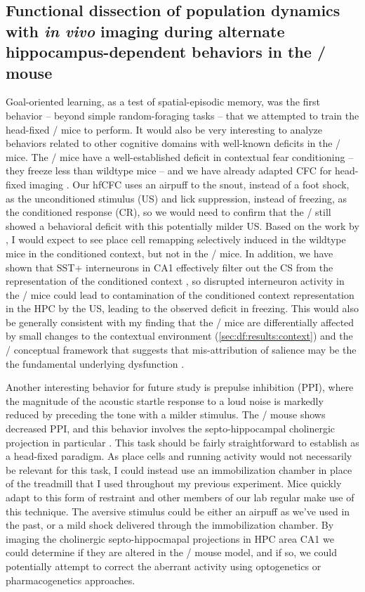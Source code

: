 \subsection{Functional dissection of population dynamics with \emph{in vivo} imaging during alternate hippocampus-dependent behaviors in the \df/ mouse}
Goal-oriented learning, as a test of spatial-episodic memory, was the first behavior -- beyond simple random-foraging tasks -- that we attempted to train the head-fixed \df/ mice to perform.
It would also be very interesting to analyze behaviors related to other cognitive domains with well-known deficits in the \df/ mice.
The \df/ mice have a well-established deficit in contextual fear conditioning \citep[CFC,][]{Stark2008} -- they freeze less than wildtype mice -- and we have already adapted CFC for head-fixed imaging \citep[hfCFC,][]{Lovett-Barron2014}.
Our hfCFC uses an airpuff to the snout, instead of a foot shock, as the unconditioned stimulus (US) and lick suppression, instead of freezing, as the conditioned response (CR), so we would need to confirm that the \df/ still showed a behavioral deficit with this potentially milder US.
Based on the work by \citeauthor{Moita2004}, I would expect to see place cell remapping selectively induced in the wildtype mice in the conditioned context, but not in the \df/ mice.
In addition, we have shown that SST+ interneurons in CA1 effectively filter out the CS from the representation of the conditioned context \citep{Lovett-Barron2014}, so disrupted interneuron activity in the \df/ mice could lead to contamination of the conditioned context representation in the \ac{HPC} by the US, leading to the observed deficit in freezing.
This would also be generally consistent with my finding that the \df/ mice are differentially affected by small changes to the contextual environment (\autoref{sec:df:results:context}) and the \scz/ conceptual framework that suggests that mis-attribution of salience may be the the fundamental underlying dysfunction \citep{Kapur2003a, VanOs2009}.

Another interesting behavior for future study is prepulse inhibition (PPI), where the magnitude of the acoustic startle response to a loud noise is markedly reduced by preceding the tone with a milder stimulus.
The \df/ mouse shows decreased PPI, and this behavior involves the septo-hippocampal cholinergic projection in particular \citep{Koch1996, Swerdlow2001}.
This task should be fairly straightforward to establish as a head-fixed paradigm.
As place cells and running activity would not necessarily be relevant for this task, I could instead use an immobilization chamber in place of the treadmill that I used throughout my previous experiment.
Mice quickly adapt to this form of restraint and other members of our lab regular make use of this technique.
The aversive stimulus could be either an airpuff as we've used in the past, or a mild shock delivered through the immobilization chamber.
By imaging the cholinergic septo-hippocmapal projections in HPC area CA1 we could determine if they are altered in the \df/ mouse model, and if so, we could potentially attempt to correct the aberrant activity using optogenetics or pharmacogenetics approaches.


